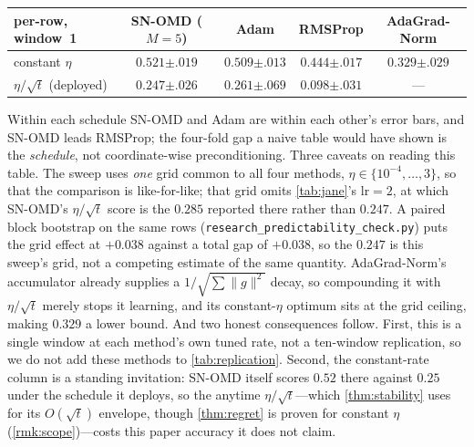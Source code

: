 \documentclass{article}
\newcommand{\norm}[1]{\lVert #1 \rVert}
\begin{document}
\begin{center}
\begin{small}
\begin{tabular}{lcccc}
\toprule
per-row, window~1 & SN-OMD ($M{=}5$) & Adam & RMSProp & AdaGrad-Norm \\
\midrule
constant $\eta$      & $\mathbf{0.521}{\scriptscriptstyle\pm.019}$ & $0.509{\scriptscriptstyle\pm.013}$ & $0.444{\scriptscriptstyle\pm.017}$ & $0.329{\scriptscriptstyle\pm.029}$ \\
$\eta/\sqrt t$ (deployed) & $0.247{\scriptscriptstyle\pm.026}$ & $\mathbf{0.261}{\scriptscriptstyle\pm.069}$ & $0.098{\scriptscriptstyle\pm.031}$ & --- \\
\bottomrule
\end{tabular}
\end{small}
\end{center}

\noindent Within each schedule SN-OMD and Adam are within each other's error bars, and SN-OMD
leads RMSProp; the four-fold gap a naive table would have shown is the \emph{schedule}, not
coordinate-wise preconditioning. Three caveats on reading this table. The sweep uses \emph{one}
grid common to all four methods, $\eta\in\{10^{-4},\dots,3\}$, so that the comparison is
like-for-like; that grid omits \cref{tab:jane}'s $\mathrm{lr}{=}2$, at which SN-OMD's
$\eta/\sqrt t$ score is the $0.285$ reported there rather than $0.247$. A paired block bootstrap
on the same rows (\texttt{research\_predictability\_check.py}) puts the grid effect at ${+}0.038$
against a total gap of ${+}0.038$, so the $0.247$ is this sweep's grid, not a competing estimate
of the same quantity. AdaGrad-Norm's accumulator already
supplies a $1/\sqrt{\sum\norm{g}^2}$ decay, so compounding it with $\eta/\sqrt t$ merely stops it
learning, and its constant-$\eta$ optimum sits at the grid ceiling, making $0.329$ a lower bound.
And two honest consequences follow. First, this is a single window at each method's own tuned rate, not a ten-window
replication, so we do not add these methods to \cref{tab:replication}. Second, the constant-rate
column is a standing invitation: SN-OMD itself scores $0.52$ there against $0.25$ under the
schedule it deploys, so the anytime $\eta/\sqrt t$---which \cref{thm:stability} uses for its
$O(\sqrt t)$ envelope, though \cref{thm:regret} is proven for constant $\eta$
(\cref{rmk:scope})---costs this paper accuracy it does not claim.
\end{document}
